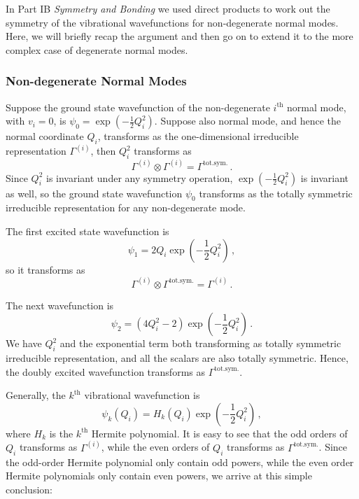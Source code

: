 \documentclass{article}
\theoremstyle{plain}\theoremheaderfont{\normalfont\itshape}\theorembodyfont{\rmfamily}\theoremseparator{.}\newtheorem*{rem}{Remark}\newtheorem*{ex}{Example}\newtheorem*{proof}{Proof}\newtheorem*{altp}{Alternative proof}
\theoremstyle{plain}\theoremheaderfont{\normalfont\bfseries}\theorembodyfont{\rmfamily}\theoremseparator{.}\newtheorem{thm}{Theorem}[section]\newtheorem{lem}[thm]{Lemma}\newtheorem{prop}[thm]{Proposition}\newtheorem*{cor}{Corollary}\newtheorem{defn}[thm]{Definition}\newtheorem{clm}[thm]{Claim}\newtheorem{clminproof}{Claim}\newtheorem{pos}{Postulate}[section]
\theoremstyle{break}\theoremheaderfont{\normalfont\itshape}\theorembodyfont{\rmfamily}\theoremseparator{.\medskip}\newtheorem*{proofskip}{Proof}\newtheorem*{exs}{Examples}\newtheorem*{rems}{Remarks}
\theoremstyle{break}\theoremheaderfont{\normalfont\bfseries}\theorembodyfont{\rmfamily}\theoremseparator{.\medskip}\newtheorem{lemskip}[thm]{Lemma}\newtheorem{defnskip}[thm]{Definition}\newtheorem{propskip}[thm]{Proposition}\newtheorem{thmskip}[thm]{Theorem}
\numberwithin{equation}{section}
\begin{document}
    In Part IB \textit{Symmetry and Bonding} we used direct products to work out the symmetry of the vibrational wavefunctions for non-degenerate normal modes. Here, we will briefly recap the argument and then go on to extend it to the more complex case of degenerate normal modes.
    
    \subsubsection{Non-degenerate Normal Modes}
    Suppose the ground state wavefunction of the non-degenerate \(i^{\text{th}}\) normal mode, with \(v_i=0\), is \(\psi_0=\exp(-\frac{1}{2}Q_i^2)\). Suppose also normal mode, and hence the normal coordinate \(Q_i\), transforms as the one-dimensional irreducible representation \(\Gamma^{(i)}\), then \(Q_i^2\) transforms as
    \begin{equation}
        \Gamma^{(i)}\otimes \Gamma^{(i)}=\Gamma^{\text{tot.sym.}}\,.
    \end{equation}
    Since \(Q_i^2\) is invariant under any symmetry operation, \(\exp(-\frac{1}{2}Q_i^2)\) is invariant as well, so the ground state wavefunction \(\psi_0\) transforms as the totally symmetric irreducible representation for any non-degenerate mode.

    The first excited state wavefunction is
    \begin{equation}
        \psi_1=2Q_i\exp\left(-\frac{1}{2}Q_i^2\right)\,,
    \end{equation}
    so it transforms as
    \begin{equation}
        \Gamma^{(i)}\otimes \Gamma^{\text{tot.sym.}}=\Gamma^{(i)}\,.
    \end{equation}

    The next wavefunction is
    \begin{equation}
        \psi_2=(4Q_i^2-2)\exp\left(-\frac{1}{2}Q_i^2\right)\,.
    \end{equation}
    We have \(Q_i^2\) and the exponential term both transforming as totally symmetric irreducible representation, and all the scalars are also totally symmetric. Hence, the doubly excited wavefunction transforms as \(\Gamma^{\text{tot.sym.}}\).

    Generally, the \(k^{\text{th}}\) vibrational wavefunction is
    \begin{equation}
        \psi_k(Q_i)=H_k(Q_i)\exp\left(-\frac{1}{2}Q_i^2\right)\,,
    \end{equation}
    where \(H_k\) is the \(k^{\text{th}}\) Hermite polynomial. It is easy to see that the odd orders of \(Q_i\) transforms as \(\Gamma^{(i)}\), while the even orders of \(Q_i\) transforms as \(\Gamma^{\text{tot.sym.}}\). Since the odd-order Hermite polynomial only contain odd powers, while the even order Hermite polynomials only contain even powers, we arrive at this simple conclusion:
\end{document}
